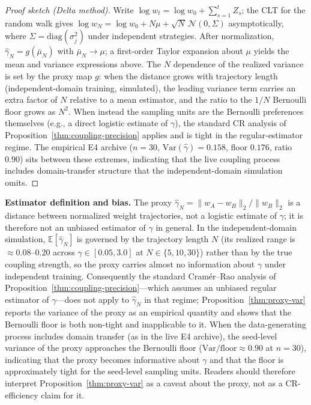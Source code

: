 \documentclass[11pt]{article}
\begin{document}
\begin{proof}[Proof sketch (Delta method)]
Write $\log w_t = \log w_0 + \sum_{s=1}^t Z_s$; the CLT for the random walk gives $\log w_N = \log w_0 + N\mu + \sqrt{N}\,\mathcal{N}(0,\Sigma)$ asymptotically, where $\Sigma=\mathrm{diag}(\sigma_j^2)$ under independent strategies. After normalization, $\hat\gamma_N=g(\bar\mu_N)$ with $\bar\mu_N\to\mu$; a first-order Taylor expansion about $\mu$ yields the mean and variance expressions above. The $N$ dependence of the realized variance is set by the proxy map $g$: when the distance grows with trajectory length (independent-domain training, simulated), the leading variance term carries an extra factor of $N$ relative to a mean estimator, and the ratio to the $1/N$ Bernoulli floor grows as $N^2$. When instead the sampling units are the Bernoulli preferences themselves (e.g., a direct logistic estimate of $\gamma$), the standard CR analysis of Proposition~\ref{thm:coupling-precision} applies and is tight in the regular-estimator regime. The empirical E4 archive ($n{=}30$, $\mathrm{Var}(\hat\gamma){=}0.158$, floor $0.176$, ratio $0.90$) sits between these extremes, indicating that the live coupling process includes domain-transfer structure that the independent-domain simulation omits.
\end{proof}

\noindent\textbf{Estimator definition and bias.} The proxy $\hat\gamma_N=\|w_A-w_B\|_2/\|w_B\|_2$ is a distance between normalized weight trajectories, not a logistic estimate of $\gamma$; it is therefore not an unbiased estimator of $\gamma$ in general. In the independent-domain simulation, $\mathbb{E}[\hat\gamma_N]$ is governed by the trajectory length $N$ (its realized range is $\approx 0.08$--$0.20$ across $\gamma \in [0.05, 3.0]$ at $N \in \{5,10,30\}$) rather than by the true coupling strength, so the proxy carries almost no information about $\gamma$ under independent training. Consequently the standard Cram\'{e}r--Rao analysis of Proposition~\ref{thm:coupling-precision}---which assumes an unbiased regular estimator of $\gamma$---does not apply to $\hat\gamma_N$ in that regime; Proposition~\ref{thm:proxy-var} reports the variance of the proxy as an empirical quantity and shows that the Bernoulli floor is both non-tight and inapplicable to it. When the data-generating process includes domain transfer (as in the live E4 archive), the seed-level variance of the proxy approaches the Bernoulli floor ($\mathrm{Var}/\mathrm{floor} \approx 0.90$ at $n{=}30$), indicating that the proxy becomes informative about $\gamma$ and that the floor is approximately tight for the seed-level sampling units. Readers should therefore interpret Proposition~\ref{thm:proxy-var} as a caveat about the proxy, not as a CR-efficiency claim for it.
\end{document}
